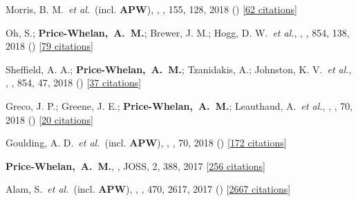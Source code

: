 {\item[{\color{deemph}\scriptsize37}]Morris, B. M.~\textit{et al.}~(incl. \textbf{APW}), , \aj, 155, 128, 2018 () [\href{http://adsabs.harvard.edu/abs/2018AJ....155..128M}{62 citations}]

\item[{\color{deemph}\scriptsize36}]Oh, S.; \textbf{Price-Whelan,~A.~M.}; Brewer, J. M.; Hogg, D. W.~\textit{et al.}, , \apj, 854, 138, 2018 () [\href{http://adsabs.harvard.edu/abs/2018ApJ...854..138O}{79 citations}]

\item[{\color{deemph}\scriptsize35}]Sheffield, A. A.; \textbf{Price-Whelan,~A.~M.}; Tzanidakis, A.; Johnston, K. V.~\textit{et al.}, , \apj, 854, 47, 2018 () [\href{http://adsabs.harvard.edu/abs/2018ApJ...854...47S}{37 citations}]

\item[{\color{deemph}\scriptsize34}]Greco, J. P.; Greene, J. E.; \textbf{Price-Whelan,~A.~M.}; Leauthaud, A.~\textit{et al.}, , \pasj, 70, 2018 () [\href{http://adsabs.harvard.edu/abs/2018PASJ...70S..19G}{20 citations}]

\item[{\color{deemph}\scriptsize33}]Goulding, A. D.~\textit{et al.}~(incl. \textbf{APW}), , \pasj, 70, 2018 () [\href{http://adsabs.harvard.edu/abs/2018PASJ...70S..37G}{172 citations}]

\item[{\color{deemph}\scriptsize32}]\textbf{Price-Whelan,~A.~M.}, , JOSS, 2, 388, 2017 [\href{http://adsabs.harvard.edu/abs/2017JOSS....2..388P}{256 citations}]

\item[{\color{deemph}\scriptsize31}]Alam, S.~\textit{et al.}~(incl. \textbf{APW}), , \mnras, 470, 2617, 2017 () [\href{http://adsabs.harvard.edu/abs/2017MNRAS.470.2617A}{2667 citations}]

}
